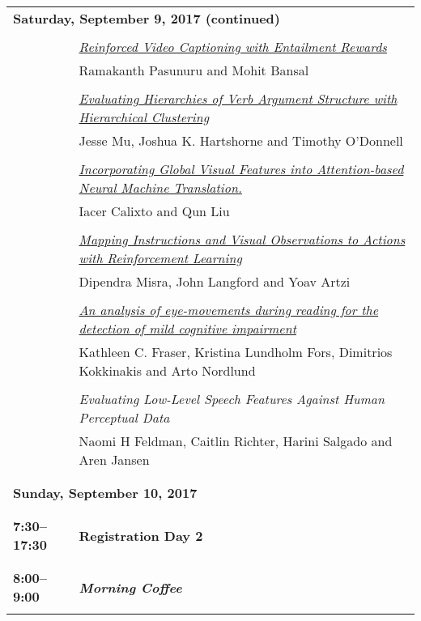 \begin{tabular}{p{20mm}p{128mm}}
\\
\multicolumn{2}{l}{\bf Saturday, September 9, 2017 (continued)} \\\\
 & \hyperlink{page.988}{\em Reinforced Video Captioning with Entailment Rewards}\\
         & Ramakanth Pasunuru and Mohit Bansal \\
\\

 & \hyperlink{page.995}{\em Evaluating Hierarchies of Verb Argument Structure with Hierarchical Clustering}\\
         & Jesse Mu, Joshua K. Hartshorne and Timothy O'Donnell \\
\\

 & \hyperlink{page.1001}{\em Incorporating Global Visual Features into Attention-based Neural Machine Translation.}\\
         & Iacer Calixto and Qun Liu \\
\\

 & \hyperlink{page.1013}{\em Mapping Instructions and Visual Observations to Actions with Reinforcement Learning}\\
         & Dipendra Misra, John Langford and Yoav Artzi \\
\\

 & \hyperlink{page.1025}{\em An analysis of eye-movements during reading for the detection of mild cognitive impairment}\\
         & Kathleen C. Fraser, Kristina Lundholm Fors, Dimitrios Kokkinakis and Arto Nordlund \\
\\

 & {\em Evaluating Low-Level Speech Features Against Human Perceptual Data}\\
         & Naomi H Feldman, Caitlin Richter, Harini Salgado and Aren Jansen \\
\\

\\\multicolumn{2}{l}{\bf Sunday, September 10, 2017} \\
\\
\\{\bf 7:30--17:30} & {\bf Registration Day 2} \\
\\
\\{\bf 8:00--9:00} & {\bf\em Morning Coffee} \\
\\
\end{tabular}
